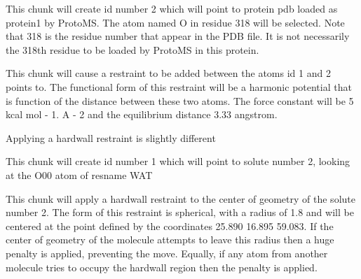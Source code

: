 \documentclass[letterpaper,10pt,english]{sphinxmanual}
\begin{document}
%
\begin{sphinxVerbatim}[commandchars=\\\{\}]
       
\end{sphinxVerbatim}

This chunk will create id number 2 which will point to protein pdb loaded as protein1 by ProtoMS. The atom named O in residue 318 will be selected. Note that 318 is the residue number that appear in the PDB file. It is not necessarily the 318th residue to be loaded by ProtoMS in this protein.

%
\begin{sphinxVerbatim}[commandchars=\\\{\}]
       
\end{sphinxVerbatim}

This chunk will cause a restraint to be added between the atoms id 1 and 2 points to. The functional form of this restraint will be a harmonic potential that is function of the distance between these two atoms. The force constant will be 5 kcal mol - 1. A - 2 and the equilibrium distance 3.33 angstrom.

\ignorespaces 
Applying a hardwall restraint is slightly different

%
\begin{sphinxVerbatim}[commandchars=\\\{\}]
       
\end{sphinxVerbatim}

This chunk will create id number 1 which will point to solute number 2, looking at the O00 atom of resname WAT

%
\begin{sphinxVerbatim}[commandchars=\\\{\}]
       
\end{sphinxVerbatim}

This chunk will apply a hardwall restraint to the center of geometry of the solute number 2. The form of this restraint is spherical, with a radius of 1.8 and will be centered at the point defined by the coordinates 25.890 16.895 59.083. If the center of geometry of the molecule attempts to leave this radius then a huge penalty is applied, preventing the move. Equally, if any atom from another molecule tries to occupy the hardwall region then the penalty is applied.
\end{document}
